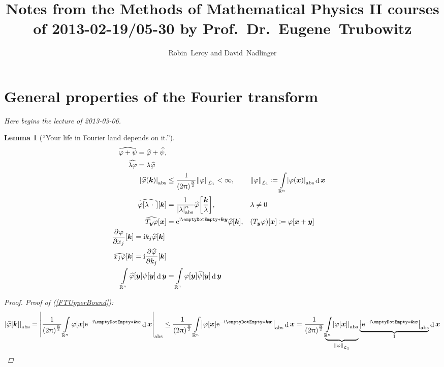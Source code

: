 \documentclass[10pt]{article}
\title{Notes from the Methods of Mathematical Physics II courses of 2013-02-19{\slash}05-30 by Prof.~Dr.~Eugene~Trubowitz}
\author{Robin~Leroy and David~Nadlinger}
\newtheorem*{lemma}{Lemma}
\DeclarePairedDelimiter\doubleBars{\Vert}{\Vert}
\DeclarePairedDelimiter\singleBars{\lvert}{\rvert}
\DeclarePairedDelimiter\parentheses{\lparen}{\rparen}
\DeclarePairedDelimiter\squareBrackets{[}{]}
\newcommand\I{\mathrm{i}}
\newcommand\E{\mathrm{e}}
\DeclareMathOperator{\diffd}{d}
\newcommand\ft\widehat
\newcommand\pderiv[3][]{\frac{\partial^{#1} #3}{{\partial {#2}}^{#1}}}
\newcommand{\R}{\mathbb{R}}
\newcommand\of[1]{\parentheses*{#1}}
\newcommand\pa[1]{\parentheses*{#1}}
\newcommand\abs[1]{\singleBars*{#1}}
\newcommand\Lnorm[2][\infty]{\doubleBars*{#2}_{#1}}
\newcommand\scal[2]{\emptyDotEmpty*{#1}{#2}}
\newcommand\gl\lambda
\newcommand\gj\varphi
\newcommand\gy\psi
\newcommand{\vx}{{\vectorsym x}}
\newcommand{\vy}{{\vectorsym y}}
\newcommand{\vk}{{\vectorsym k}}
\newcommand\placeholder{\,\:\cdot\:\,}
\renewcommand\of[1]{\squareBrackets*{#1}}
\renewcommand\abs[1]{\singleBars*{#1}_{\mathrm{abs}}}
\renewcommand\Lnorm[2][\infty]{\doubleBars*{#2}_{\mathcal{L}_{#1}}}
\newcommand\Int[1]{\int\limits_{#1}}
\newcommand{\Rn}{{\R^n}}
\newcommand{\ftnrm}{\frac{1}{\pa{2\Pi}^\frac{n}{2}} }
\begin{document}
  \maketitle
  \section{General properties of the Fourier transform}
  \noindent \emph{Here begins the lecture of 2013-03-06.}
  \begin{lemma}[``Your life in Fourier land depends on it.'']
    \begin{align}
      \label{FTLinearity}
      \begin{split}      
      \ft{\gj + \gy} &= \ft{\gj} + \ft{\gy},\\
      \ft{\gl \gj} &= \gl \ft{\gj} 
      \end{split}
      \\
      \label{FTUpperBound}
      \abs{\ft{\gj}(\vk)} &\leq \ftnrm\Lnorm[1]{\gj}<\infty, &&
      \Lnorm[1]{\gj} \coloneqq \Int\Rn \abs{\gj(\vx)} \diffd \vx
      \\
      \label{FTScaling}
      \ft{\gj\of{\gl\placeholder}}\of\vk &= \frac{1}{\abs{\gl}^n}\ft{\gj}\of{\frac\vk\gl}, &&
      \gl\neq 0
      \\
      \label{FTTranslation}
      \ft{T_\vy\gj}\of\vx &= \E^{\I\scal\vk\vy}\ft\gj\of\vk, &&
      \pa{T_\vy\gj}\of\vx \coloneqq \gj\of{\vx+\vy}
      \\
      \label{FTDerivative}
      \begin{split}
      \pderiv{x_j}\gj\of\vk &= \I k_j \ft\gj\of\vk \\ 
      \ft{x_j \gj}\of\vk &= \I \pderiv{k_j}{\ft\gj} \of\vk
      \end{split}
      \\
      \label{FTUnitary}
      \Int\Rn\ft\gj\of\vy \gy\of\vy \diffd\vy &= \Int\Rn \gj\of\vy \ft\gy\of\vy \diffd\vy
    \end{align}
    \begin{proof}
      Proof of (\ref{FTUpperBound}):
      \begin{equation*}
       \abs{\ft\gj\of\vk} 
        = \abs{\ftnrm\Int\Rn \gj\of\vx \E^{-\I \scal\vk\vx}\diffd\vx} 
        \leq \ftnrm\Int\Rn \abs{\gj\of\vx 
        \E^{-\I \scal\vk\vx}}\diffd\vx  = \ftnrm
        \underbrace{\Int\Rn \abs{\gj\of\vx}}_{\Lnorm[1]{\gj}}
        \underbrace{\abs{\E^{-\I\scal\vk\vx}}}_{1}\diffd\vx \\
      \end{equation*}

\end{proof}
\end{lemma}
\end{document}
